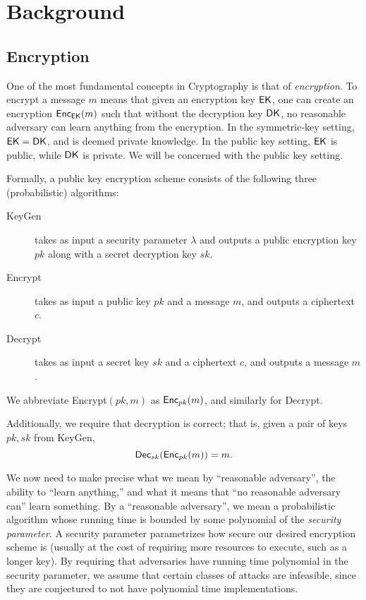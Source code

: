 \chapter{Background} \label{chap: background}
\section{Encryption}
	One of the most fundamental concepts in Cryptography is that of \textit{encryption}. To encrypt a message $m$ means that given an encryption key $\sf EK$, one can create an encryption ${\sf Enc}_{\sf EK}(m)$ such that without the decryption key $\sf DK$, no reasonable adversary can learn anything from the encryption. In the symmetric-key setting, $\sf EK = \sf DK$, and is deemed private knowledge. In the public key setting, $\sf EK$ is public, while $\sf DK$ is private. We will be concerned with the public key setting.

		Formally, a public key encryption scheme consists of the following three (probabilistic) algorithms:
	\begin{description}
	\item[KeyGen] takes as input a security parameter $\lambda$ and outputs a public encryption key $pk$ along with a secret decryption key $sk$.
	\item[Encrypt] takes as input a public key $pk$ and a message $m$, and outputs a ciphertext $c$.
	\item[Decrypt] takes as input a secret key $sk$ and a ciphertext $c$, and outputs a message $m$.
	\end{description}

	We abbreviate Encrypt$(pk, m)$ as ${\sf Enc}_{pk}(m)$, and similarly for Decrypt.

	Additionally, we require that decryption is correct; that is, given a pair of keys $pk, sk$ from KeyGen,
	\[{\sf Dec}_{sk}({\sf Enc}_{pk}(m)) = m.\]


	We now need to make precise what we mean by ``reasonable adversary'', the ability to ``learn anything,'' and what it means that ``no reasonable adversary can'' learn something. By a ``reasonable adversary'', we mean a probabilistic algorithm whose running time is bounded by some polynomial of the \textit{security parameter}. A security parameter parametrizes how secure our desired encryption scheme is (usually at the cost of requiring more resources to execute, such as a longer key). By requiring that adversaries have running time polynomial in the security parameter, we assume that certain classes of attacks are infeasible, since they are conjectured to not have polynomial time implementations.


